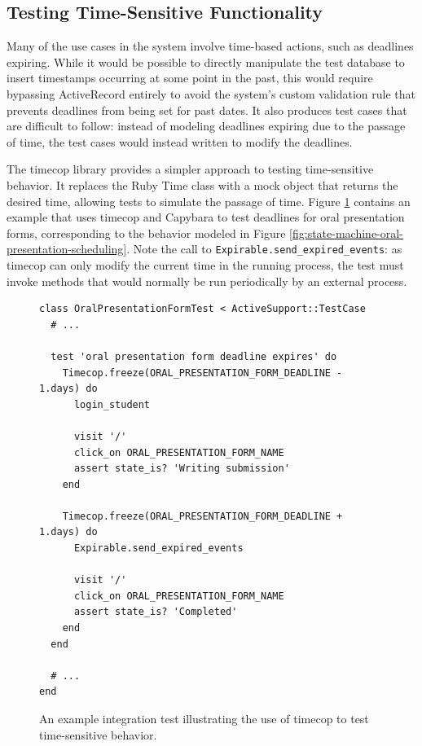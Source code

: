 \documentclass[document.tex]{subfiles}
\begin{document}
\subsection {Testing Time-Sensitive Functionality}

Many of the use cases in the system involve time-based actions, such as deadlines expiring. While it would be possible to directly manipulate the test database to insert timestamps occurring at some point in the past, this would require bypassing ActiveRecord entirely to avoid the system's custom validation rule that prevents deadlines from being set for past dates. It also produces test cases that are difficult to follow: instead of modeling deadlines expiring due to the passage of time, the test cases would instead written to modify the deadlines.

The timecop \cite{timecop} library provides a simpler approach to testing time-sensitive behavior. It replaces the Ruby Time class with a mock object that returns the desired time, allowing tests to simulate the passage of time. Figure \ref{fig:4ys-test-timecop} contains an example that uses timecop and Capybara to test deadlines for oral presentation forms, corresponding to the behavior modeled in Figure \ref{fig:state-machine-oral-presentation-scheduling}. Note the call to \verb!Expirable.send_expired_events!: as timecop can only modify the current time in the running process, the test must invoke methods that would normally be run periodically by an external process.

\begin{figure}[!ht]
  \begin{lstlisting}
class OralPresentationFormTest < ActiveSupport::TestCase
  # ...

  test 'oral presentation form deadline expires' do
    Timecop.freeze(ORAL_PRESENTATION_FORM_DEADLINE - 1.days) do
      login_student

      visit '/'
      click_on ORAL_PRESENTATION_FORM_NAME
      assert state_is? 'Writing submission'
    end

    Timecop.freeze(ORAL_PRESENTATION_FORM_DEADLINE + 1.days) do
      Expirable.send_expired_events

      visit '/'
      click_on ORAL_PRESENTATION_FORM_NAME
      assert state_is? 'Completed'
    end
  end

  # ...
end
  \end{lstlisting}
  \cprotect \caption{An example integration test illustrating the use of timecop to test time-sensitive behavior.}
  \label{fig:4ys-test-timecop}
\end{figure}
\end{document}
